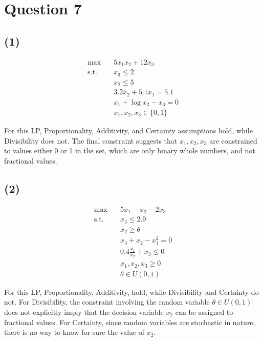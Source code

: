 \documentclass[12pt]{article}
\begin{document}
\section*{Question 7}

\subsection*{(1)}
\begin{align*}
    \max \quad & 5x_{1} x_{2} + 12 x_{3} \\ 
    \text{s.t.} \quad & x_{3} \leq 2 \\ 
    & x_{2} \leq 5 \\ 
    & 3.2 x_{2} + 5.1 x_{1} = 5.1 \\ 
    & x_{1} + \log x_{2} - x_{3} = 0 \\ 
    & x_{1}, x_{2}, x_{3} \in \{0,1\}
\end{align*}

\noindent For this LP, Proportionality, Additivity, and Certainty assumptions hold, while Divisibility does not. The final constraint suggests that $x_{1}, x_{2}, x_{3}$ are constrained to values either 0 or 1 in the set, which are only binary whole numbers, and not fractional values. 

\subsection*{(2)}

\begin{align*}
    \max \quad & 5x_{1} - x_{2} - 2 x_{3} \\ 
    \text{s.t.} \quad & x_{3} \leq 2.9 \\ 
    & x_{2} \geq \theta \\ 
    & x_{3} + x_{2} - x_{1}^{2} = 0 \\ 
    & 0.4 \frac{x_{1}}{x_{2}} + x_{3} \leq  0 \\ 
    & x_{1}, x_{2}, x_{3} \geq 0 \\ 
    & \theta \in U(0,1)
\end{align*}

\noindent For this LP, Proportionality, Additivity, hold, while Divisibility and Certainty do not. For Divisibility, the constraint involving the random variable $\theta \in U(0,1)$ does not explicitly imply that the decision variable $x_2$ can be assigned to fractional values. For Certainty, since random variables are stochastic in nature, there is no way to know for sure the value of $x_2$. 
\end{document}
